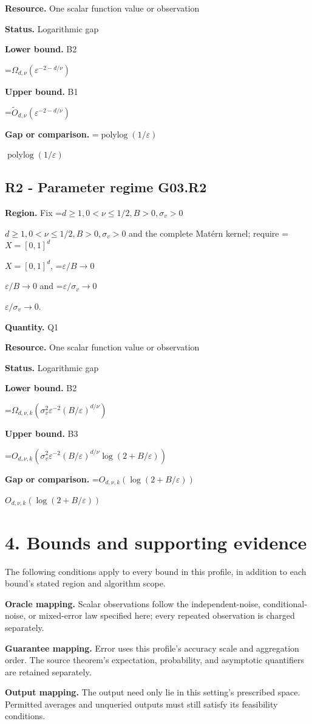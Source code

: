 \documentclass[10pt,a4paper]{article}
\newcommand{\AtlasMath}[1]{\par\begingroup\centering\setbox0=\hbox{$\displaystyle #1$}\ifdim\wd0>1.4\linewidth\typeout{ATLAS WIDE FORMULA: \the\wd0}\fi\ifdim\wd0>\linewidth\resizebox{\linewidth}{!}{\box0}\else\box0\fi\par\endgroup}
\newcommand{\AtlasInlineMath}[1]{\begingroup\setbox0=\hbox{$#1$}\ifdim\wd0>.4\linewidth\endgroup\AtlasMath{#1}\else\endgroup$#1$\fi}
\begin{document}
\textbf{Resource.} One scalar function value or observation

\textbf{Status.} Logarithmic gap

\textbf{Lower bound.} B2

\AtlasMath{\Omega_{d,\nu}(\varepsilon^{-2-d/\nu})}
\textbf{Upper bound.} B1

\AtlasMath{\widetilde{O}_{d,\nu}(\varepsilon^{-2-d/\nu})}
\textbf{Gap or comparison.} \AtlasInlineMath{\operatorname{polylog}(1/\varepsilon)}

\subsection{R2 - Parameter regime G03.R2}
\textbf{Region.} Fix \AtlasInlineMath{d\ge1,0<\nu\le1/2,B>0,\sigma_v>0} and the complete Matérn kernel; require \AtlasInlineMath{X=[0,1]^d}, \AtlasInlineMath{\varepsilon/B\to0} and \AtlasInlineMath{\varepsilon/\sigma_v\to0}.

\textbf{Quantity.} Q1

\textbf{Resource.} One scalar function value or observation

\textbf{Status.} Logarithmic gap

\textbf{Lower bound.} B2

\AtlasMath{\Omega_{d,\nu,k}(\sigma_v^2\varepsilon^{-2}(B/\varepsilon)^{d/\nu})}
\textbf{Upper bound.} B3

\AtlasMath{O_{d,\nu,k}(\sigma_v^2\varepsilon^{-2}(B/\varepsilon)^{d/\nu}\log(2+B/\varepsilon))}
\textbf{Gap or comparison.} \AtlasInlineMath{O_{d,\nu,k}(\log(2+B/\varepsilon))}

\section{4. Bounds and supporting evidence}
The following conditions apply to every bound in this profile, in addition to each bound's stated region and algorithm scope.

\textbf{Oracle mapping.} Scalar observations follow the independent-noise, conditional-noise, or mixed-error law specified here; every repeated observation is charged separately.

\textbf{Guarantee mapping.} Error uses this profile's accuracy scale and aggregation order. The source theorem's expectation, probability, and asymptotic quantifiers are retained separately.

\textbf{Output mapping.} The output need only lie in this setting's prescribed space. Permitted averages and unqueried outputs must still satisfy its feasibility conditions.
\end{document}
